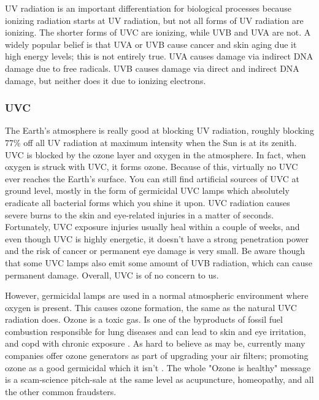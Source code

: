 UV radiation is an important differentiation for biological processes because ionizing radiation starts at UV radiation, but not all forms of UV radiation are ionizing. The shorter forms of UVC are ionizing, while UVB and UVA are not. A widely popular belief is that UVA or UVB cause cancer and skin aging due it high energy levels; this is not entirely true. UVA causes damage via indirect DNA damage due to free radicals. UVB causes damage via direct and indirect DNA damage, but neither does it due to ionizing electrons.\vspace{3 mm}

\subsubsection{UVC}

The Earth's atmosphere is really good at blocking UV radiation, roughly blocking 77\% off all UV radiation at maximum intensity when the Sun is at its zenith. UVC is blocked by the ozone layer and oxygen in the atmosphere. In fact, when oxygen is struck with UVC, it forms ozone. Because of this, virtually no UVC ever reaches the Earth's surface. You can still find artificial sources of UVC at ground level, mostly in the form of germicidal UVC lamps which absolutely eradicate all bacterial forms which you shine it upon. UVC radiation causes severe burns to the skin and eye-related injuries in a matter of seconds. Fortunately, UVC exposure injuries usually heal within a couple of weeks, and even though UVC is highly energetic, it doesn't have a strong penetration power and the risk of cancer or permanent eye damage is very small. Be aware though that some UVC lamps also emit some amount of UVB radiation, which can cause permanent damage. Overall, UVC is of no concern to us.\vspace{3 mm}

However, germicidal lamps are used in a normal atmospheric environment where oxygen is present. This causes ozone formation, the same as the natural UVC radiation does. Ozone is a toxic gas. Is one of the byproducts of fossil fuel combustion responsible for lung diseases \cite{ref:Stewart2017-sk, ref:badozone2, ref:Jule2018-it} and can lead to skin and eye irritation, and \gls{copd} with chronic exposure \cite{ref:Burnett1997-ra}. As hard to believe as may be, currently many companies offer ozone generators as part of upgrading your air filters; promoting ozone as a good germicidal which it isn't \cite{ref:badozone}. The whole "Ozone is healthy" message is a scam-science pitch-sale at the same level as acupuncture, homeopathy, and all the other common fraudsters.

